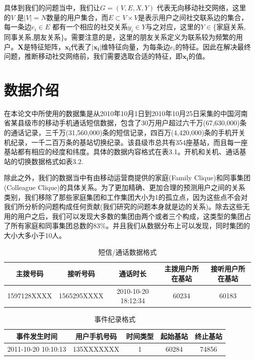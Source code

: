 具体到我们的问题当中，我们让$G = (V, E, X, Y)$ 代表无向移动社交网络，这里的$V$ 是$|V| = N$数量的用户集合，而$E \subset V \times V$是表示用户之间社交联系边的集合，每一条边$e_i \in E$ 都有一个相应的社交关系$y_i \in Y$与之对应，这里的$Y \in $\{家庭关系, 同事关系,朋友关系\}。需要注意的是，这里的朋友关系定义为联系较为频繁的用户。$\textbf{X}$是特征矩阵，$\bm{x_i}$代表了$|\bm{x_i}|$维特征向量，为每条边$e_i$的特征。因此在解决最终问题，推断移动社交网络前，我们需要选取合适的特征，即$\bm{x_i}$的值。



\section{数据介绍}
在本论文中所使用的数据集是从2010年10月1日到2010年10月25日采集的中国河南省某县级市的移动手机通话短信数据，包含了30万用户超过六千万(67,630,000)条的通话记录，三千万(31,560,000)条的短信记录，四百万(4,420,000)条的手机开关机纪录，一千二百万条的基站切换纪录。该县级市总共有354座基站，而且每一座基站都有相应的经度和纬度。具体的数据内容格式在表3.1。开机和关机、通话基站的切换数据格式如表3.2.




除此之外，我们的数据当中有由移动运营商提供的家庭(Family Clique)和同事集团(Colleague Clique)的具体关系。为了更加精确、更加合理的预测用户之间的关系类别，我们移除了那些家庭集团和工作集团大小为1的孤立点，因为这些点不会对我们所分析的问题构成任何贡献(我们研究的问题本身就是边的关系)。除去这些无用的用户之后，我们可以发现大多数的集团由两个或者三个构成，这类型的集团占了所有家庭和同事集团总数的83\%。并且我们从数据分布上可以发现，同时集团的大小大多小于10人。


\begin{table}
    \centering
    \caption{短信/通话数据格式}
    \label{call-record}
    \begin{tabular}{c|c|c|c|c}
        \hline
        主拨号码 & 接听号码 & 通话时长 & 主拨用户所在基站 & 接听用户所在基站 \\ \hline
        1597128XXXX & 1565295XXXX & 2010-10-20 18:12:34 & 60234 & 60183 \\ \hline
    \end{tabular}
\end{table}


\begin{table}
    \centering
    \caption{事件纪录格式}
    \label{event-record}
    \begin{tabular}{c|c|c|c|c}
    \hline
    事件发生时间 & 用户手机号码 & 时间类型 & 起始基站 & 终止基站 \\ \hline
    2011-10-20 10:10:13   & 135XXXXXXX & 1 & 60284 & 74856  \\ \hline
    \end{tabular}
\end{table}



